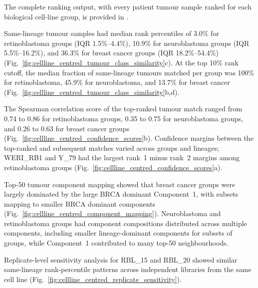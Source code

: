 The complete ranking output, with every patient tumour sample ranked for
each biological cell-line group, is provided in
.

Same-lineage tumour samples had median rank percentiles of 3.0\% for
retinoblastoma groups (IQR 1.5\%--4.4\%), 10.9\% for neuroblastoma groups
(IQR 5.5\%--16.2\%), and 36.3\% for breast cancer groups (IQR
18.2\%--54.4\%) (Fig.~\ref{fig:cellline_centred_tumour_class_similarity}c). At the
top 10\% rank cutoff, the median fraction of same-lineage tumours matched per
group was 100\% for retinoblastoma, 45.9\% for neuroblastoma, and 13.7\% for
breast cancer (Fig.~\ref{fig:cellline_centred_tumour_class_similarity}b,d).

The Spearman correlation score of the top-ranked tumour match ranged from
0.74 to 0.86 for retinoblastoma groups, 0.35 to 0.75 for neuroblastoma
groups, and 0.26 to 0.63 for breast cancer groups
(Fig.~\ref{fig:cellline_centred_confidence_scores}b). Confidence margins
between the top-ranked and subsequent matches varied across groups and
lineages; WERI\_RB1 and Y\_79 had the largest rank~1 minus rank~2 margins
among retinoblastoma groups (Fig.~\ref{fig:cellline_centred_confidence_scores}a).

Top-50 tumour component mapping showed that breast cancer groups were largely
dominated by the large BRCA dominant Component~1, with subsets mapping to
smaller BRCA dominant components
(Fig.~\ref{fig:cellline_centred_component_mapping}). Neuroblastoma and
retinoblastoma groups had component compositions distributed across multiple
components, including smaller lineage-dominant components for subsets of
groups, while Component~1 contributed to many top-50 neighbourhoods.

Replicate-level sensitivity analysis for RBL\_15 and RBL\_20 showed similar
same-lineage rank-percentile patterns across independent libraries from the
same cell line (Fig.~\ref{fig:cellline_centred_replicate_sensitivity}).

